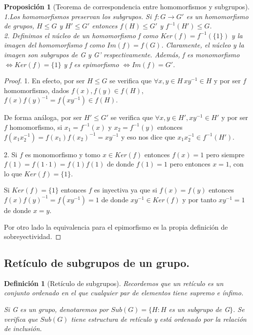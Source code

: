 \documentclass{article}
\theoremstyle{theorem-style}  %
\newtheorem{proposition}[theorem]{Proposición}
\theoremstyle{definition-style}
\newtheorem{definition}{Definición}[section]
\theoremstyle{example-style}
\begin{document}
\begin{proposition}[Teorema de correspondencia entre homomorfismos y subgrupos]
1.Los homomorfismos preservan los subgrupos. Si $f:G \rightarrow G'$ es un homomorfismo de grupos, $H \le G$ y $H' \le G'$ entonces $f(H) \le G'$ y $f^{-1}(H') \le G$.\\
2. Definimos el núcleo de un homomorfismo f como $Ker(f) = f^{-1}(\{1\})$ y la imagen del homomorfismo f como $Im(f) = f(G)$. Claramente, el núcleo y la imagen son subgrupos de G y G' respectivamente. Además, f es monomorfismo $\iff Ker(f) = \{1\}$ y f es epimorfismo $\iff Im(f) = G'$.
\end{proposition}
\begin{proof}
1. En efecto, por ser $H \le G$ se verifica que $\forall x,y \in H \, xy^{-1} \in H$ y por ser $f$ homomorfismo, dados $f(x),f(y) \in f(H)$, $f(x)f(y)^{-1} = f(xy^{-1}) \in f(H)$. 

De forma análoga, por ser $H' \le G'$ se verifica que $\forall x,y \in H', xy^{-1} \in H'$ y por ser $f$ homomorfismo, si $x_1 = f^{-1}(x)$ y $x_2 = f^{-1}(y)$ entonces $f(x_1x_2^{-1}) = f(x_1)f(x_2)^{-1} = xy^{-1}$ y eso nos dice que $x_1x_2^{-1} \in f^{-1}(H')$.

2. Si $f$ es monomorfismo y tomo $x \in Ker(f)$ entonces $f(x) = 1$ pero siempre $f(1) = f(1 \cdot 1) = f(1)f(1)$ de donde $f(1) = 1$ pero entonces $x = 1$, con lo que $Ker(f) = \{1\}$.

Si $Ker(f) = \{1\}$ entonces $f$ es inyectiva ya que si $f(x) = f(y)$ entonces $f(x)f(y)^{-1} = f(xy^{-1}) = 1$ de donde $xy^{-1} \in Ker(f)$ y por tanto $xy^{-1} = 1$ de donde $x = y$.

Por otro lado la equivalencia para el epimorfismo es la propia definición de sobreyectividad.
\end{proof}

\subsection{Retículo de subgrupos de un grupo.}

\begin{definition}[Retículo de subgrupos]
Recordemos que un retículo es un conjunto ordenado en el que cualquier par de elementos tiene supremo e ínfimo.

Si G es un grupo, denotaremos por $Sub(G) = \{H : H$ es un subgrupo de G$\}$. Se verifica que $Sub(G)$ tiene estructura de retículo y está ordenado por la relación de inclusión.
\end{definition}
\end{document}
